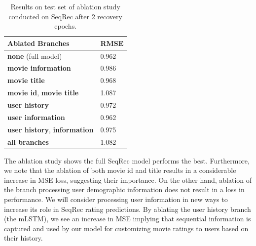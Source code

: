 \documentclass{bioinfo}
\begin{document}
\begin{table}[H]
\centering
\begin{tabular}{|l|l|}
\hline
\textbf{Ablated Branches} &  \textbf{RMSE} \\ \hline

\textbf{none} (full model) &  0.962\\ \hline
\textbf{movie information} & 0.986 \\ \hline
\textbf{movie title} & 0.968 \\ \hline
\textbf{movie id}, \textbf{movie title} & 1.087 \\ \hline
\textbf{user history} &  0.972\\ \hline
\textbf{user information} &  0.962\\ \hline
\textbf{user history}, \textbf{information} &  0.975\\ \hline
\textbf{all branches} & 1.082\\ \hline

\end{tabular}
\caption{Results on test set of ablation study conducted on SeqRec after 2 recovery epochs.}
\label{table:ablation}
\end{table}

The ablation study shows the full SeqRec model performs the best. Furthermore, we note that the ablation of both movie id and title results in a considerable increase in MSE loss, suggesting their importance. On the other hand, ablation of the branch processing user demographic information does not result in a loss in performance. We will consider processing user information in new ways to increase its role in SeqRec rating predictions. By ablating the user history branch (the mLSTM), we see an increase in MSE implying that sequential information is captured and used by our model for customizing movie ratings to users based on their history. 
\end{document}
